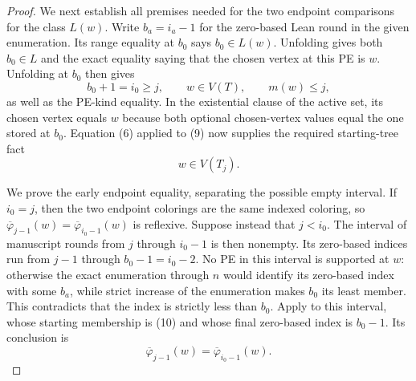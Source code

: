 \begin{proof}
We next establish all premises needed for the two endpoint comparisons for
the class \(L(w)\).  Write \(b_a=i_a-1\) for the zero-based Lean round in
the given enumeration.  Its range equality at \(b_0\) says
\(b_0\in L(w)\).  Unfolding  gives both
\(b_0\in L\) and the exact equality saying that the chosen vertex at this
PE is \(w\).  Unfolding  at \(b_0\)
then gives
\[
 b_0+1=i_0\geq j,\qquad w\in V(T),\qquad m(w)\leq j,            \tag{9}
\]
as well as the PE-kind equality.  In the existential clause of the active
set, its chosen vertex equals \(w\) because both optional chosen-vertex
values equal the one stored at \(b_0\).  Equation (6) applied to (9) now
supplies the required starting-tree fact
\[
                              w\in V(T_j).                     \tag{10}
\]

We prove the early endpoint equality, separating the possible empty
interval.  If \(i_0=j\), then the two endpoint colorings are the same
indexed coloring, so
\(\overline\varphi_{j-1}(w)=
  \overline\varphi_{i_0-1}(w)\) is reflexive.  Suppose instead that
\(j<i_0\).  The interval of manuscript rounds from \(j\) through
\(i_0-1\) is then nonempty.  Its zero-based indices run from \(j-1\)
through \(b_0-1=i_0-2\).  No PE in this interval is supported at \(w\):
otherwise the exact enumeration through \(n\) would identify its
zero-based index with some \(b_a\), while strict increase of the
enumeration makes \(b_0\) its least member.  This contradicts that the
index is strictly less than \(b_0\).  Apply
 to this interval, whose starting
membership is (10) and whose final zero-based index is \(b_0-1\).
Its conclusion is
\[
                  \overline\varphi_{j-1}(w)
                    =\overline\varphi_{i_0-1}(w).              \tag{11}
\]


\end{proof}
